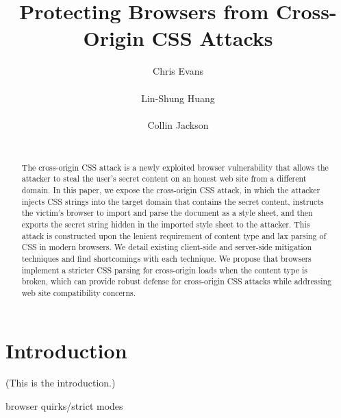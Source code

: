 \documentclass{acm_proc_article-sp}
\begin{document}
\title{Protecting Browsers from Cross-Origin CSS Attacks}

\author{
\alignauthor
Chris Evans\\
      \\
\alignauthor
Lin-Shung Huang\\
      \\
\alignauthor
Collin Jackson\\
      \\
}

\maketitle
\begin{abstract}
The cross-origin CSS attack is a newly exploited browser vulnerability that allows the attacker to steal the user's secret content on an honest web site from a different domain. In this paper, we expose the cross-origin CSS attack, in which the attacker injects CSS strings into the target domain that contains the secret content, instructs the victim's browser to import and parse the document as a style sheet, and then exports the secret string hidden in the imported style sheet to the attacker. This attack is constructed upon the lenient requirement of content type and lax parsing of CSS in modern browsers. We detail existing client-side and server-side mitigation techniques and find shortcomings with each technique. We propose that browsers implement a stricter CSS parsing for cross-origin loads when the content type is broken, which can provide robust defense for cross-origin CSS attacks while addressing web site compatibility concerns.
\end{abstract}




\section{Introduction}
(This is the introduction.)

browser quirks/strict modes
\end{document}
